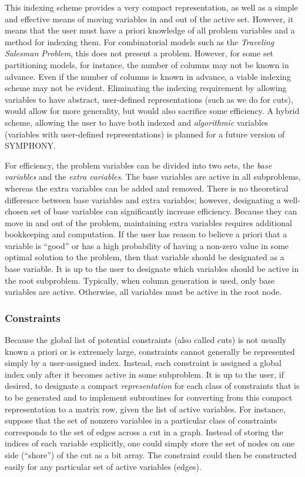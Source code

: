 This indexing scheme provides a very compact representation, as well
as a simple and effective means of moving variables in and out of the
active set. However, it means that the user must have a priori
knowledge of all problem variables and a method for indexing them. For
combinatorial models such as the {\em Traveling Salesman Problem},
this does not present a problem. However, for some set partitioning
models, for instance, the number of columns may not be known in
advance. Even if the number of columns is known in advance, a viable
indexing scheme may not be evident. Eliminating the indexing
requirement by allowing variables to have abstract, user-defined
representations (such as we do for cuts), would allow for more
generality, but would also sacrifice some efficiency. A hybrid scheme,
allowing the user to have both indexed and {\em algorithmic} variables
(variables with user-defined representations) is planned for a future 
version of SYMPHONY.

For efficiency, the problem variables can be divided into two sets, the
{\em base variables} and the {\em extra variables}. The base variables
are active in all subproblems, whereas the extra variables can be
added and removed. There is no theoretical difference between
base variables and extra variables; however, designating a well-chosen
set of base variables can significantly increase efficiency. Because
they can move in and out of the problem, maintaining extra variables
requires additional bookkeeping and computation. If the user has
reason to believe a priori that a variable is ``good'' or has a high
probability of having a non-zero value in some optimal solution to the
problem, then that variable should be designated as a base variable.
It is up to the user to designate which variables should be active in
the root subproblem. Typically, when column generation is used, only base 
variables are active. Otherwise, all variables must be active in the 
root node.

\subsubsection{Constraints}
\label{constraints}

Because the global list of potential constraints (also called cuts) is
not usually known a priori or is extremely large, constraints cannot
generally be represented simply by a user-assigned index. Instead,
each constraint is assigned a global index only after it becomes
active in some subproblem. It is up to the user, if desired, to
designate a compact {\em representation} for each class of constraints
that is to be generated and to implement subroutines for converting
from this compact representation to a matrix row, given the list of
active variables. For instance, suppose that the set of nonzero
variables in a particular class of constraints corresponds to the set
of edges across a cut in a graph. Instead of storing the indices of
each variable explicitly, one could simply store the set of nodes on
one side (``shore'') of the cut as a bit array. The constraint could
then be constructed easily for any particular set of active variables
(edges).

